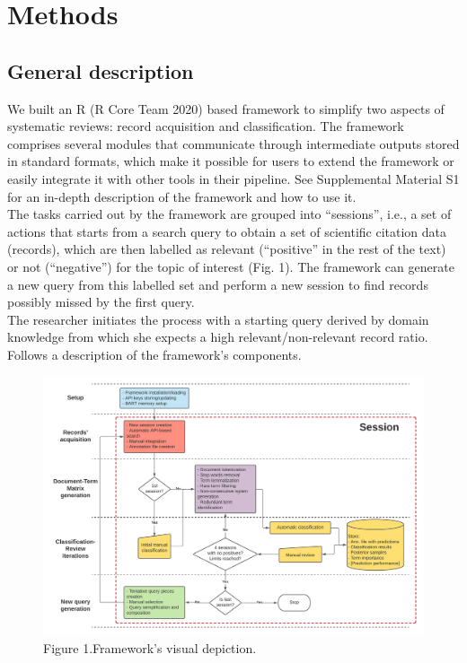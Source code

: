 \documentclass{article}
\begin{document}
\hypertarget{methods}{%
\section{Methods}\label{methods}}

\hypertarget{general-description}{%
\subsection{General description}\label{general-description}}

We built an R (R Core Team 2020) based framework to simplify two aspects
of systematic reviews: record acquisition and classification. The
framework comprises several modules that communicate through
intermediate outputs stored in standard formats, which make it possible
for users to extend the framework or easily integrate it with other
tools in their pipeline. See Supplemental Material S1 for an in-depth
description of the framework and how to use it.\\
The tasks carried out by the framework are grouped into ``sessions'',
i.e., a set of actions that starts from a search query to obtain a set
of scientific citation data (records), which are then labelled as
relevant (``positive'' in the rest of the text) or not (``negative'')
for the topic of interest (Fig. 1). The framework can generate a new
query from this labelled set and perform a new session to find records
possibly missed by the first query.\\
The researcher initiates the process with a starting query derived by
domain knowledge from which she expects a high relevant/non-relevant
record ratio.\\
Follows a description of the framework's components.\\

\begin{figure}
\includegraphics[width=1\linewidth]{methods_diagram} \caption{Figure 1.Framework's visual depiction.}\label{fig:method_diagram}
\end{figure}
\end{document}
